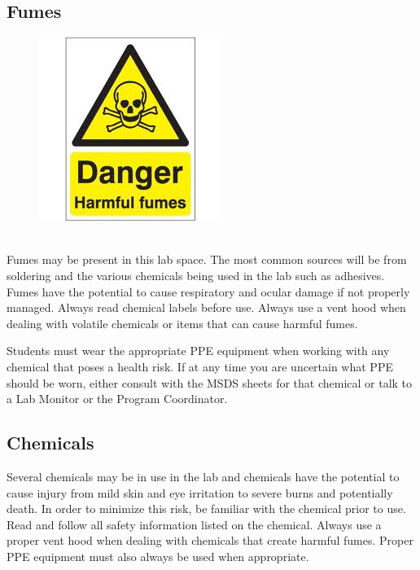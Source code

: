 \subsection{Fumes}
\begin{framed}
\begin{figure}
\includegraphics[width=\linewidth]{images/fumes_hazard.jpg}
\end{figure}
\ \\
Fumes may be present in this lab space. The most common sources will be from soldering and the various chemicals being used in the lab such as adhesives. Fumes have the potential to cause respiratory and ocular damage if not properly managed. Always read chemical labels before use. Always use a vent hood when dealing with volatile chemicals or items that can cause harmful fumes.
\end{framed}

Students must wear the appropriate PPE equipment when working with any chemical that poses a health risk.  If at any time you are uncertain what PPE should be worn, either consult with the MSDS sheets for that chemical or talk to a Lab Monitor or the Program Coordinator.  

\subsection{Chemicals}
Several chemicals may be in use in the lab and chemicals have the potential to cause injury from mild skin and eye irritation to severe burns and potentially death. In order to minimize this risk, be familiar with the chemical prior to use. Read and follow all safety information listed on the chemical. Always use a proper vent hood when dealing with chemicals that create harmful fumes.  Proper PPE equipment must also always be used when appropriate.  

